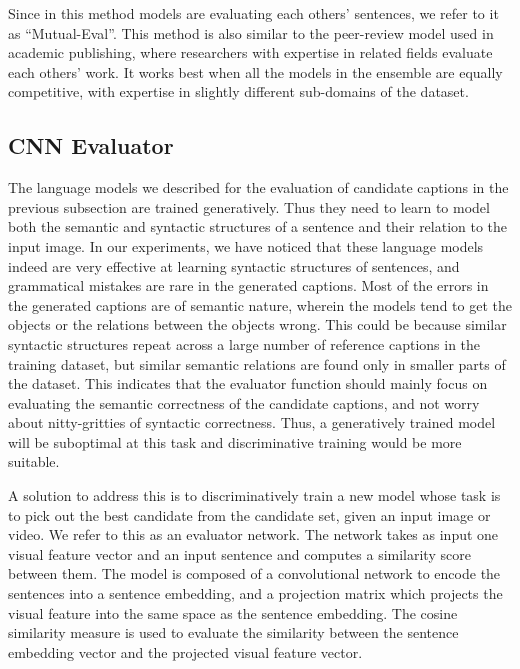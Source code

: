 Since in this method models are evaluating each others' sentences, we refer to it
as ``Mutual-Eval''. 
This method is also similar to the peer-review model used in academic
publishing, where researchers with expertise in related fields evaluate each
others' work.
It works best when all the models in the ensemble are equally competitive, with
expertise in slightly different sub-domains of the dataset.

\subsection{CNN Evaluator}
The language models we described for the evaluation of candidate captions in the
previous subsection are trained generatively.
Thus they need to learn to model both the semantic and syntactic structures of a
sentence and their relation to the input image.
In our experiments, we have noticed that these language models indeed are very
effective at learning syntactic structures of sentences, and grammatical
mistakes are rare in the generated captions.
Most of the errors in the generated captions are of semantic nature, wherein the
models tend to get the objects or the relations between the objects wrong.
This could be because similar syntactic structures repeat across a large number of
reference captions in the training dataset, but similar semantic relations
are found only in smaller parts of the dataset.
This indicates that the evaluator function should mainly focus on
evaluating the semantic correctness of the candidate captions, and not worry
about nitty-gritties of syntactic correctness. 
Thus, a generatively trained model will be suboptimal at this task and
discriminative training would be more suitable. 

A solution to address this is to discriminatively train a new model whose task is to
pick out the best candidate from the candidate set, given an input image or
video.
We refer to this as an evaluator network.
The network takes as input one visual feature vector and an input sentence and
computes a similarity score between them. 
The model is composed of a convolutional network to encode the sentences into a
sentence embedding, and a projection matrix which projects the visual feature
into the same space as the sentence embedding.
The cosine similarity measure is used to evaluate the similarity between the
sentence embedding vector and the projected visual feature vector. 


